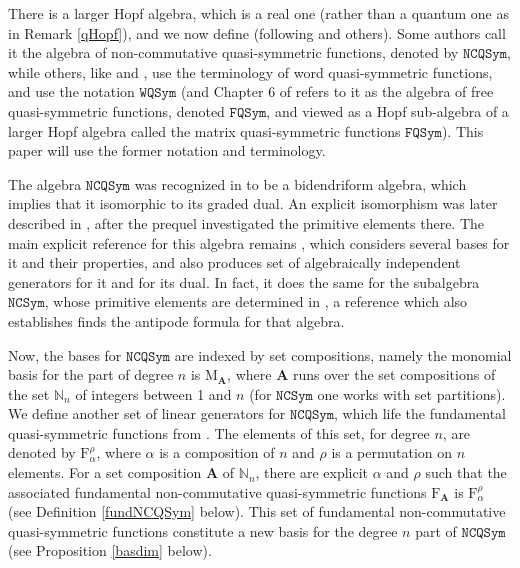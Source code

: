\documentclass{article}
\theoremstyle{definition}
\begin{document}
\medskip

There is a larger Hopf algebra, which is a real one (rather than a quantum one as in Remark \ref{qHopf}), and we now define (following \cite{[BZ]} and others). Some authors call it the algebra of non-commutative quasi-symmetric functions, denoted by $\mathtt{NCQSym}$, while others, like \cite{[Ml1]} and \cite{[Ml2]}, use the terminology of word quasi-symmetric functions, and use the notation $\mathtt{WQSym}$ (and Chapter 6 of \cite{[Hi1]} refers to it as the algebra of free quasi-symmetric functions, denoted $\mathtt{FQSym}$, and viewed as a Hopf sub-algebra of a larger Hopf algebra called the matrix quasi-symmetric functions $\mathtt{FQSym}$). This paper will use the former notation and terminology.

The algebra $\mathtt{NCQSym}$ was recognized in \cite{[NT]} to be a bidendriform algebra, which implies that it isomorphic to its graded dual. An explicit isomorphism was later described in \cite{[Ml2]}, after the prequel \cite{[Ml1]} investigated the primitive elements there. The main explicit reference for this algebra remains \cite{[BZ]}, which considers several bases for it and their properties, and also produces set of algebraically independent generators for it and for its dual. In fact, it does the same for the subalgebra $\mathtt{NCSym}$, whose primitive elements are determined in \cite{[LM]}, a reference which also establishes finds the antipode formula for that algebra.

Now, the bases for $\mathtt{NCQSym}$ are indexed by set compositions, namely the monomial basis for the part of degree $n$ is $\mathrm{M}_{\mathbf{A}}$, where $\mathbf{A}$ runs over the set compositions of the set $\mathbb{N}_{n}$ of integers between 1 and $n$ (for $\mathtt{NCSym}$ one works with set partitions). We define another set of linear generators for $\mathtt{NCQSym}$, which life the fundamental quasi-symmetric functions from \cite{[Ge]}. The elements of this set, for degree $n$, are denoted by $\mathrm{F}_{\alpha}^{\rho}$, where $\alpha$ is a composition of $n$ and $\rho$ is a permutation on $n$ elements. For a set composition $\mathbf{A}$ of $\mathbb{N}_{n}$, there are explicit $\alpha$ and $\rho$ such that the associated fundamental non-commutative quasi-symmetric functions $\mathrm{F}_{\mathbf{A}}$ is $\mathrm{F}_{\alpha}^{\rho}$ (see Definition \ref{fundNCQSym} below). This set of fundamental non-commutative quasi-symmetric functions constitute a new basis for the degree $n$ part of $\mathtt{NCQSym}$ (see Proposition \ref{basdim} below).
\end{document}
